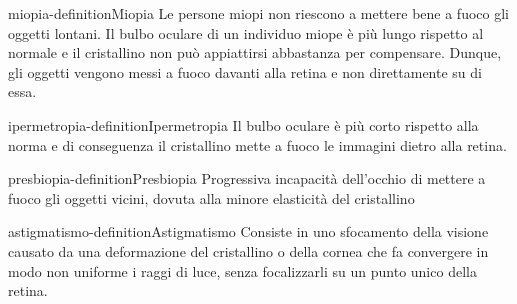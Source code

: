 \documentclass[preview]{standalone}
\begin{document}
\begin{snippetdefinition}{miopia-definition}{Miopia}
    Le persone miopi non riescono a mettere bene a fuoco gli oggetti lontani. Il bulbo oculare di
    un individuo miope è più lungo rispetto al normale e il cristallino non può appiattirsi
    abbastanza per compensare. Dunque, gli oggetti vengono messi a fuoco davanti alla retina
    e non direttamente su di essa.
\end{snippetdefinition}


\begin{snippetdefinition}{ipermetropia-definition}{Ipermetropia}
    Il bulbo oculare è più corto rispetto alla norma e di conseguenza il cristallino mette a fuoco
    le immagini dietro alla retina.
\end{snippetdefinition}

\begin{snippetdefinition}{presbiopia-definition}{Presbiopia}
    Progressiva incapacità dell'occhio di mettere a fuoco gli oggetti vicini, dovuta alla minore
    elasticità del cristallino
\end{snippetdefinition}

\begin{snippetdefinition}{astigmatismo-definition}{Astigmatismo}
    Consiste in uno sfocamento della visione causato da una deformazione del cristallino o della
    cornea che fa convergere in modo non uniforme i raggi di luce, senza focalizzarli su un
    punto unico della retina.
\end{snippetdefinition}
\end{document}
